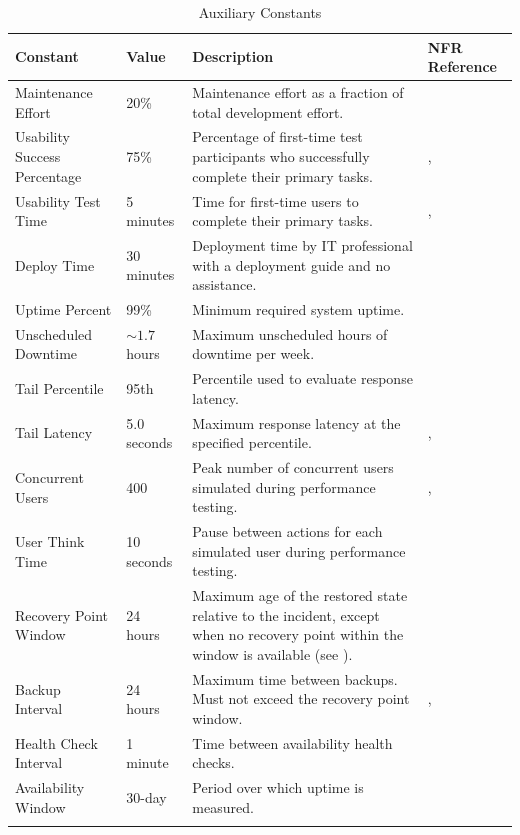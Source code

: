\documentclass[12pt]{article}
\newcommand{\descriptiveid}[1]{\texttt{\detokenize{#1}}}
\newcommand{\idref}[1]{\hyperref[#1]{\descriptiveid{#1}}}
\newcommand{\dprref}[1]{\idref{#1}}
\newcounter{tin}
\newcommand{\maintFrac}{20\%}
\newcommand{\usabilityTestTime}{5 minutes}
\newcommand{\usabilityTestSuccessPerc}{75\%}
\newcommand{\deployTime}{30 minutes}
\newcommand{\uptimePercent}{99\%}
\newcommand{\unschedDowntime}{$\sim1.7$ hours} %
\newcommand{\tailPercentile}{95th}
\newcommand{\tailLatency}{5.0 seconds}
\newcommand{\concurrentUsers}{400}
\newcommand{\thinkTime}{10 seconds}
\newcommand{\recoveryPointWindow}{24 hours}
\newcommand{\backupInterval}{24 hours} %
\newcommand{\healthCheckInterval}{1 minute}
\newcommand{\availabilityWindow}{30-day}
\begin{document}
  \begin{longtable}{|p{2cm}|p{2cm}|p{4cm}|p{4.5cm}|}
    \hline
    \textbf{Constant} & \textbf{Value} & \textbf{Description} & \textbf{NFR Reference} \\ \hline
    Maintenance Effort & \maintFrac & Maintenance effort as a fraction of total development effort. & \idref{NFR_ChangeEffort} \\ \hline
    Usability Success Percentage & \usabilityTestSuccessPerc & Percentage of first-time test participants who successfully complete their primary tasks. & \idref{NFR_UsabilityFirstSuccess}, \idref{NFR_LearnUnassisted} \\ \hline
    Usability Test Time & \usabilityTestTime & Time for first-time users to complete their primary tasks. & \idref{NFR_UsabilityFirstSuccess}, \idref{NFR_LearnUnassisted} \\ \hline
    Deploy Time & \deployTime & Deployment time by IT professional with a deployment guide and no assistance. & \idref{NFR_DeployUnassisted} \\ \hline
    Uptime Percent & \uptimePercent & Minimum required system uptime. & \idref{NFR_Uptime} \\ \hline
    Unscheduled Downtime & \unschedDowntime & Maximum unscheduled hours of downtime per week. & \idref{NFR_Uptime} \\ \hline
    Tail Percentile & \tailPercentile & Percentile used to evaluate response latency. & \idref{NFR_PerfTail} \\ \hline
    Tail Latency & \tailLatency & Maximum response latency at the specified percentile. & \idref{NFR_PerfTail}, \idref{NFR_PeakUsers} \\ \hline
    Concurrent Users & \concurrentUsers & Peak number of concurrent users simulated during performance testing. & \idref{NFR_PerfTail}, \idref{NFR_PeakUsers} \\ \hline
    User Think Time & \thinkTime & Pause between actions for each simulated user during performance testing. & \idref{NFR_PerfTail} \\ \hline
    Recovery Point Window & \recoveryPointWindow & Maximum age of the restored state relative to the incident, except when no recovery point within the window is available (see \idref{NFR_Recoverable}). & \idref{NFR_Recoverable} \\ \hline
    Backup Interval & \backupInterval & Maximum time between backups. Must not exceed the recovery point window. & \dprref{DPR_DailyDataBackups}, \idref{NFR_Recoverable} \\ \hline
    Health Check Interval & \healthCheckInterval & Time between availability health checks. & \idref{NFR_Uptime} \\ \hline
    Availability Window & \availabilityWindow & Period over which uptime is measured. & \idref{NFR_Uptime} \\ \hline
    \caption{Auxiliary Constants}
    \label{tab:AuxiliaryConstants}
\end{longtable}
\end{document}
